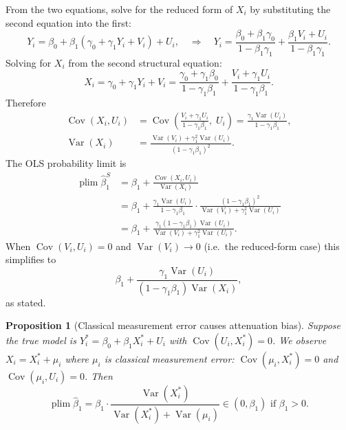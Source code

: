 \documentclass[12pt,a4paper]{article}
\theoremstyle{plain}
\newtheorem{propositio}{Proposition}[section]
\theoremstyle{definition}
\renewenvironment{proof}{\pushQED{\qed}\normalfont}{\popQED\par\nobreak}
\newcommand{\Cov}{\operatorname{Cov}}
\newcommand{\Var}{\operatorname{Var}}
\newcommand{\plim}{\operatorname{plim}}
\begin{document}
\begin{proof}
From the two equations, solve for the reduced form of $X_i$ by substituting the second equation into the first:
\[
  Y_i = \beta_0 + \beta_1(\gamma_0+\gamma_1 Y_i+V_i)+U_i,
  \quad\Rightarrow\quad
  Y_i = \frac{\beta_0+\beta_1\gamma_0}{1-\beta_1\gamma_1}
        + \frac{\beta_1 V_i + U_i}{1-\beta_1\gamma_1}.
\]
Solving for $X_i$ from the second structural equation:
\[
  X_i = \gamma_0 + \gamma_1 Y_i + V_i
       = \frac{\gamma_0+\gamma_1\beta_0}{1-\gamma_1\beta_1}
         + \frac{V_i+\gamma_1 U_i}{1-\gamma_1\beta_1}.
\]
Therefore
\begin{align*}
  \Cov(X_i,U_i)
  &= \Cov\!\left(\frac{V_i+\gamma_1 U_i}{1-\gamma_1\beta_1},\;U_i\right)
   = \frac{\gamma_1\Var(U_i)}{1-\gamma_1\beta_1},
\\[4pt]
  \Var(X_i)
  &= \frac{\Var(V_i)+\gamma_1^2\Var(U_i)}{(1-\gamma_1\beta_1)^2}.
\end{align*}
The OLS probability limit is
\[
  \begin{aligned}
    \plim\hat\beta_1^S
    &= \beta_1 + \frac{\Cov(X_i,U_i)}{\Var(X_i)}\\
    &= \beta_1 + \frac{\gamma_1\Var(U_i)}{1-\gamma_1\beta_1}
       \cdot \frac{(1-\gamma_1\beta_1)^2}{\Var(V_i)+\gamma_1^2\Var(U_i)}\\
    &= \beta_1 + \frac{\gamma_1(1-\gamma_1\beta_1)\Var(U_i)}{\Var(V_i)+\gamma_1^2\Var(U_i)}.
  \end{aligned}
\]
When $\Cov(V_i,U_i)=0$ and $\Var(V_i)\to 0$ (i.e.\ the reduced-form case) this simplifies to
\[
  \beta_1 + \frac{\gamma_1\Var(U_i)}{(1-\gamma_1\beta_1)\Var(X_i)},
\]
as stated.
\end{proof}

\begin{propositio}[Classical measurement error causes attenuation bias\label{prop:cme}]
Suppose the true model is $Y_i^* = \beta_0 + \beta_1 X_i^* + U_i$ with $\Cov(U_i,X_i^*)=0$.
We observe $X_i = X_i^* + \mu_i$ where $\mu_i$ is \emph{classical measurement error}: $\Cov(\mu_i,X_i^*)=0$ and $\Cov(\mu_i,U_i)=0$.
Then
\[
  \plim\hat\beta_1
  = \beta_1 \cdot \frac{\Var(X_i^*)}{\Var(X_i^*)+\Var(\mu_i)}
  \in (0,\beta_1)\text{ if }\beta_1>0.
\]
\end{propositio}
\end{document}
